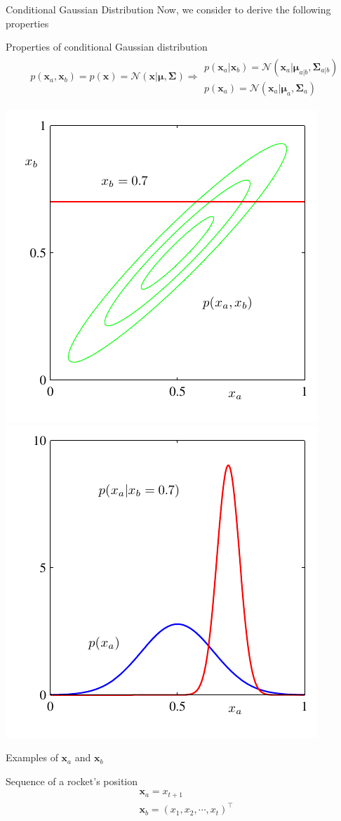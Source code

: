 \documentclass[10pt]{beamer}
\begin{document}
    \begin{frame}{Conditional Gaussian Distribution}
        Now, we consider to derive the following properties
        \begin{block}{Properties of conditional Gaussian distribution}
            \begin{align*}
                &p(\mathbf x_a, \mathbf x_b) = p(\mathbf x) = \mathcal N(\mathbf x | \bm \mu, \bm \Sigma) 
                \Rightarrow 
                \begin{array}{l}
                     p(\mathbf x_a | \mathbf x_b) = \mathcal N(\mathbf x_a | \bm \mu_{a|b}, \bm \Sigma_{a|b})  \\
                     p(\mathbf x_a) = \mathcal N(\mathbf x_a | \bm \mu_a, \bm \Sigma_a) 
                \end{array}
            \end{align*}
        \end{block}
        \begin{center}
            \includegraphics[width=0.45\hsize]{figs/Figure2_9a.pdf}
            \hfill
            \includegraphics[width=0.45\hsize]{figs/Figure2_9b.pdf}
        \end{center}
    \end{frame}
    
    \begin{frame}{Examples of $\mathbf x_a$ and $\mathbf x_b$}
        \begin{exampleblock}{Sequence of a rocket's position}
            \begin{align*}
                &\mathbf x_a = x_{t+1} \\
                &\mathbf x_b = (x_1, x_2, \cdots, x_t)^\top
            \end{align*}
        \end{exampleblock}
    \end{frame}
    
\end{document}
